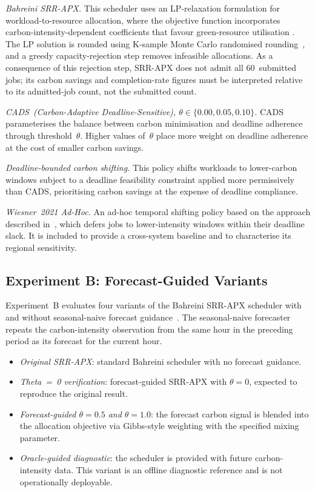\documentclass[conference]{IEEEtran}
\begin{document}
\textit{Bahreini SRR-APX.} This scheduler uses an LP-relaxation formulation
for workload-to-resource allocation, where the objective function incorporates
carbon-intensity-dependent coefficients that favour green-resource utilisation
\cite{bahreini2023dispatcher,bahreini2022approx}. The LP solution is rounded
using K-sample Monte Carlo randomised rounding~\cite{bampis2014energy}, and a
greedy capacity-rejection step removes infeasible allocations. As a consequence
of this rejection step, SRR-APX does not admit all 60~submitted jobs; its
carbon savings and completion-rate figures must be interpreted relative to its
admitted-job count, not the submitted count.

\textit{CADS~(Carbon-Adaptive Deadline-Sensitive), $\theta \in \{0.00, 0.05,
0.10\}$.} CADS parameterises the balance between carbon minimisation and
deadline adherence through threshold~$\theta$. Higher values of~$\theta$ place
more weight on deadline adherence at the cost of smaller carbon savings.

\textit{Deadline-bounded carbon shifting.} This policy shifts workloads to
lower-carbon windows subject to a deadline feasibility constraint applied more
permissively than CADS, prioritising carbon savings at the expense of deadline
compliance.

\textit{Wiesner~2021 Ad-Hoc.} An ad-hoc temporal shifting policy based on the
approach described in~\cite{wiesner2021}, which defers jobs to lower-intensity
windows within their deadline slack. It is included to provide a cross-system
baseline and to characterise its regional sensitivity.

\subsection{Experiment B: Forecast-Guided Variants}
\label{subsec:forecast}

Experiment~B evaluates four variants of the Bahreini SRR-APX scheduler with
and without seasonal-naive forecast guidance~\cite{makridakis2020m4,
hyndman2021forecasting}. The seasonal-naive forecaster repeats the
carbon-intensity observation from the same hour in the preceding period as
its forecast for the current hour.

\begin{itemize}
  \item \textit{Original SRR-APX}: standard Bahreini scheduler with no
        forecast guidance.
  \item \textit{Theta~=~0 verification}: forecast-guided SRR-APX with
        $\theta = 0$, expected to reproduce the original result.
  \item \textit{Forecast-guided $\theta = 0.5$ and $\theta = 1.0$}: the
        forecast carbon signal is blended into the allocation objective via
        Gibbs-style weighting with the specified mixing parameter.
  \item \textit{Oracle-guided diagnostic}: the scheduler is provided with
        future carbon-intensity data. This variant is an offline
        diagnostic reference and is not operationally deployable.
\end{itemize}
\end{document}
